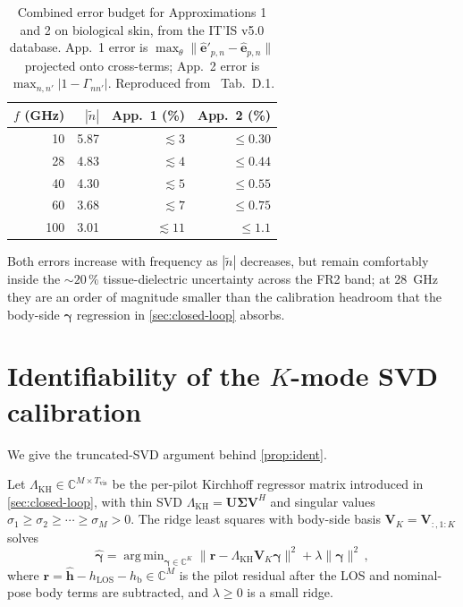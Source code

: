 \documentclass[journal,twocolumn,10pt]{IEEEtran}
\theoremstyle{plain}
\theoremstyle{definition}
\theoremstyle{remark}
\newcommand{\hh}{\mathbf{h}}
\newcommand{\gammab}{\bm{\gamma}}
\newcommand{\hLOS}{h_{\mathrm{LOS}}}
\newcommand{\hbody}{h_{\mathrm{b}}}
\newcommand{\Complex}{\mathbb{C}}
\newcommand{\ntilde}{\tilde{n}}
\DeclareMathOperator*{\argmin}{arg\,min}
\begin{document}
\begin{table}[!htbp]
\centering
\caption{Combined error budget for Approximations 1 and 2 on
biological skin, from the IT'IS v5.0 database. App.~1 error is
$\max_\theta \|\hat{\bm{e}}'_{p,n} - \hat{\bm{e}}_{p,n}\|$ projected
onto cross-terms; App.~2 error is $\max_{n,n'}|1 - \Gamma_{nn'}|$.
Reproduced from~\cite{WydaegheMonograph} Tab.~D.1.}
\label{tab:approx-acc}
\begin{tabular}{rrrr}
\toprule
$f$ (GHz) & $|\ntilde|$ & App.~1 (\%) & App.~2 (\%) \\
\midrule
10  & 5.87 & $\lesssim 3$  & $\leq 0.30$ \\
28  & 4.83 & $\lesssim 4$  & $\leq 0.44$ \\
40  & 4.30 & $\lesssim 5$  & $\leq 0.55$ \\
60  & 3.68 & $\lesssim 7$  & $\leq 0.75$ \\
100 & 3.01 & $\lesssim 11$ & $\leq 1.1$  \\
\bottomrule
\end{tabular}
\end{table}

Both errors increase with frequency as $|\ntilde|$ decreases, but
remain comfortably inside the $\sim\!20\,\%$ tissue-dielectric
uncertainty across the FR2 band; at 28~GHz they are an order of
magnitude smaller than the calibration headroom that the body-side
$\gammab$ regression in \cref{sec:closed-loop} absorbs.

\section{Identifiability of the $K$-mode SVD calibration}
\label{app:ident}

We give the truncated-SVD argument behind \cref{prop:ident}.

Let $\Lambda_{\mathrm{KH}} \in \Complex^{M \times T_{\mathrm{vis}}}$
be the per-pilot Kirchhoff regressor matrix introduced in
\cref{sec:closed-loop}, with thin SVD
$\Lambda_{\mathrm{KH}} = \bm{U}\bm{\Sigma}\bm{V}^{\!H}$ and singular
values $\sigma_1 \geq \sigma_2 \geq \cdots \geq \sigma_M > 0$. The
ridge least squares with body-side basis
$\bm{V}_K = \bm{V}_{:,1:K}$ solves
\begin{equation}\label{eq:gamma-ridge}
  \hat{\gammab} = \argmin_{\gammab \in \Complex^K}
    \bigl\|\bm{r} - \Lambda_{\mathrm{KH}}\bm{V}_K\gammab\bigr\|^2
  + \lambda \|\gammab\|^2\,,
\end{equation}
where $\bm{r} = \hat{\hh} - \hLOS - \hbody \in \Complex^M$ is the
pilot residual after the LOS and nominal-pose body terms are
subtracted, and $\lambda \geq 0$ is a small ridge.
\end{document}
